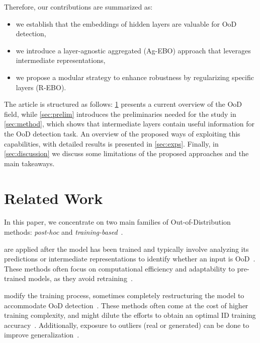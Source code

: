 \documentclass[10pt,twocolumn,a4paper]{article}
\newcommand{\minisection}[1]{\vspace{0.03in} \noindent {\bf #1}}
\begin{document}
Therefore, our contributions are summarized as:
\begin{itemize}
    \vspace{0.5em}
    \item we establish that the embeddings of hidden layers are valuable for OoD detection,
    \vspace{0.5em}
    \item we introduce a layer-agnostic aggregated (Ag-EBO) approach that leverages intermediate representations,
    \vspace{0.5em}
    \item we propose a modular strategy to enhance robustness by regularizing specific layers (R-EBO). 
    \vspace{0.5em}
\end{itemize}

The article is structured as follows: \cref{sec:related} presents a current overview of the OoD field, while \cref{sec:prelim} introduces the preliminaries needed for the study in \cref{sec:method}, which shows that intermediate layers contain useful information for the OoD detection task. An overview of the proposed ways of exploiting this capabilities, with detailed results is presented in \cref{sec:exps}. Finally, in \cref{sec:discussion} we discuss some limitations of the proposed approaches and the main takeaways.

\section{Related Work}\label{sec:related}
In this paper, we concentrate on two main families of Out-of-Distribution methods: \textit{post-hoc} and \textit{training-based}~\cite{liu2021towards, yang2024generalized}.

\minisection{Post-hoc methods} are applied after the model has been trained and typically involve analyzing its predictions or intermediate representations to identify whether an input is OoD~\cite{guo2017calibration, wei2022mitigating, hendrycks2018baseline}. These methods often focus on computational efficiency and adaptability to pre-trained models, as they avoid retraining~\cite{liu2021towards}.

\minisection{Training-based methods} modify the training process, sometimes completely restructuring the model to accommodate OoD detection~\cite{chang2020generalized, devries2018learning, tack2020csi}. These methods often come at the cost of higher training complexity, and might dilute the efforts to obtain an optimal ID training accuracy~\cite{liu2021towards, masana2018metric}. Additionally, exposure to outliers (real or generated) can be done to improve generalization~\cite{wang2023learning}.
\end{document}
